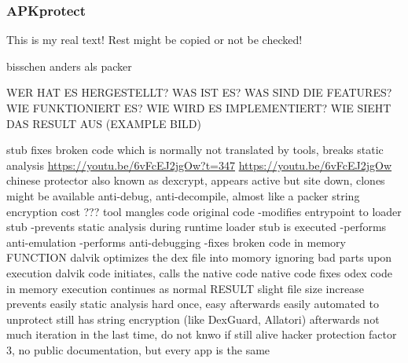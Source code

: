 \subsubsection{APKprotect} \label{subsubsection:counter-reengineering-propack-apkprotect}
This is my real text! Rest might be copied or not be checked!

bisschen anders als packer


WER HAT ES HERGESTELLT? WAS IST ES? WAS SIND DIE FEATURES? WIE FUNKTIONIERT ES? WIE WIRD ES IMPLEMENTIERT? WIE SIEHT DAS RESULT AUS (EXAMPLE BILD)\newline

stub fixes broken code which is normally not translated by tools, breaks static analysis \newline
\url{https://youtu.be/6vFcEJ2jgOw?t=347}\newline
\url{https://youtu.be/6vFcEJ2jgOw}\newline
chinese protector\newline
also known as dexcrypt, appears active but site down, clones might be available\newline
anti-debug, anti-decompile, almost like a packer\newline
string encryption\newline
cost ???\newline
tool mangles code original code\newline
-modifies entrypoint to loader stub\newline
-prevents static analysis\newline
during runtime loader stub is executed\newline
-performs anti-emulation\newline
-performs anti-debugging\newline
-fixes broken code in memory\newline
FUNCTION\newline
dalvik optimizes the dex file into momory ignoring bad parts\newline
upon execution dalvik code initiates, calls the native code\newline
native code fixes odex code in memory\newline
execution continues as normal\newline
RESULT\newline
slight file size increase\newline
prevents easily static analysis\newline
hard once, easy afterwards\newline
easily automated to unprotect\newline
still has string encryption (like DexGuard, Allatori) afterwards\newline
not much iteration in the last time, do not knwo if still alive\newline
hacker protection factor 3, no public documentation, but every app is the same\newline
